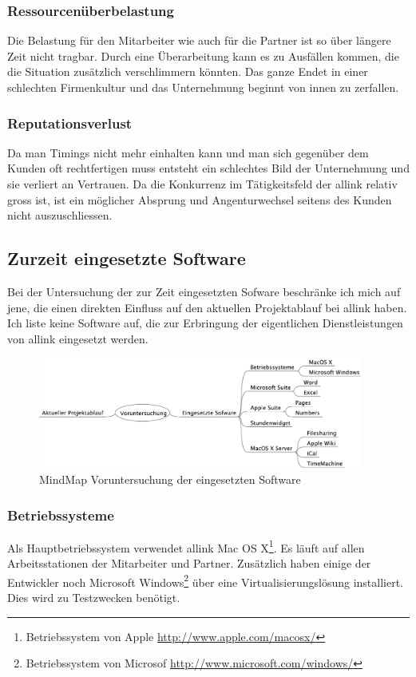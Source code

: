 \subsubsection{Ressourcenüberbelastung}
Die Belastung für den Mitarbeiter wie auch für die Partner ist so über
längere Zeit nicht tragbar. Durch eine Überarbeitung kann es zu Ausfällen kommen, die
die Situation zusätzlich verschlimmern könnten. Das ganze Endet in einer 
schlechten Firmenkultur und das Unternehmung beginnt von innen zu zerfallen.

\subsubsection{Reputationsverlust}
Da man Timings nicht mehr einhalten kann und man sich gegenüber dem Kunden
oft rechtfertigen muss entsteht ein schlechtes Bild der Unternehmung und sie
verliert an Vertrauen. Da die Konkurrenz im Tätigkeitsfeld der allink relativ
gross ist, ist ein möglicher Absprung und Angenturwechsel seitens des Kunden nicht 
auszuschliessen.

\subsection{Zurzeit eingesetzte Software}
Bei der Untersuchung der zur Zeit eingesetzten Sofware beschränke ich mich auf jene,
die einen direkten Einfluss auf den aktuellen Projektablauf bei allink haben.
Ich liste keine Software auf, die zur Erbringung der eigentlichen Dienstleistungen
von allink eingesetzt werden.

\begin{figure}[htbp]
\begin{center}
\includegraphics[width=0.95\textwidth,angle=0]{./mindmaps/voruntersuchung_software.pdf}
\caption{MindMap Voruntersuchung der eingesetzten Software}
\label{pic:voruntersuchung_software}
\end{center}
\end{figure}

\subsubsection{Betriebssysteme}
Als Hauptbetriebssystem verwendet allink Mac OS X\footnote{Betriebssystem von Apple \url{http://www.apple.com/macosx/}}.
Es läuft auf allen Arbeitsstationen der Mitarbeiter und Partner. Zusätzlich haben einige der
Entwickler noch Microsoft Windows\footnote{Betriebssystem von Microsof \url{http://www.microsoft.com/windows/}}
über eine Virtualisierungslösung installiert. Dies wird zu Testzwecken benötigt.

